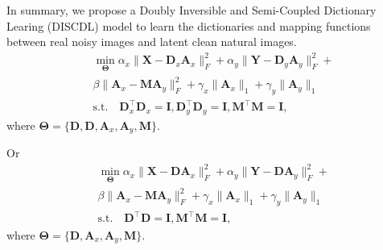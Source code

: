 \documentclass[10pt,twocolumn,letterpaper]{article}
\begin{document}
In summary, we propose a Doubly Inversible and Semi-Coupled Dictionary Learing (DISCDL) model to learn the dictionaries and mapping functions between real noisy images and latent clean natural images. 
\begin{equation}
\begin{split}
&
\min_{\bm{\Theta}}
\alpha_{x}\|\bm{X}-\bm{D}_{x}\bm{A}_{x}\|_{F}^{2}
+
\alpha_{y}\|\bm{Y}-\bm{D}_{y}\bm{A}_{y}\|_{F}^{2}
+
\\
&
\beta
\|\bm{A}_{x}-\bm{M}\bm{A}_{y}\|_{F}^{2}
+
\gamma_{x}\|\bm{A}_{x}\|_{1}
+
\gamma_{y}\|\bm{A}_{y}\|_{1}
\\
&
\text{s.t.}
\quad 
\bm{D}_{x}^{\top}\bm{D}_{x}=\bm{I}
,
\bm{D}_{y}^{\top}\bm{D}_{y}=\bm{I}
,
\bm{M}^{\top}\bm{M}=\bm{I}
,
\end{split}
\end{equation}
where $\bm{\Theta}=\{\bm{D},\bm{D},\bm{A}_{x},\bm{A}_{y},\bm{M}\}$. 

Or
\begin{equation}
\begin{split}
&
\min_{\bm{\Theta}}
\alpha_{x}\|\bm{X}-\bm{D}\bm{A}_{x}\|_{F}^{2}
+
\alpha_{y}\|\bm{Y}-\bm{D}\bm{A}_{y}\|_{F}^{2}
+
\\
&
\beta
\|\bm{A}_{x}-\bm{M}\bm{A}_{y}\|_{F}^{2}
+
\gamma_{x}\|\bm{A}_{x}\|_{1}
+
\gamma_{y}\|\bm{A}_{y}\|_{1}
\\
&
\text{s.t.}
\quad 
\bm{D}^{\top}\bm{D}=\bm{I}
,
\bm{M}^{\top}\bm{M}=\bm{I}
,
\end{split}
\end{equation}
where $\bm{\Theta}=\{\bm{D},\bm{A}_{x},\bm{A}_{y},\bm{M}\}$. 
\end{document}
